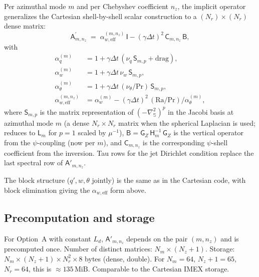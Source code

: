 \documentclass[11pt]{article}
\newcommand{\Lapsphere}{\nabla^2_{\!\mathbb{S}}}
\newcommand{\Ld}{L_d}
\newcommand{\Ra}{\mathrm{Ra}}
\newcommand{\Pr}{\mathrm{Pr}}
\begin{document}
Per azimuthal mode $m$ and per Chebyshev coefficient $n_{z}$, the
implicit operator generalizes the Cartesian shell-by-shell scalar
construction to a $(N_{r}) \times (N_{r})$ dense matrix:
\begin{equation}
  \mathsf{A}_{m, n_{z}}^{\prime}
  \;=\; \alpha_{w,\mathrm{eff}}^{(m, n_{z})}\,\mathsf{I}
  - (\gamma \Delta t)^{2}\,\mathsf{C}_{m, n_{z}}\,\mathsf{B},
  \label{eq:Aprime}
\end{equation}
with
\begin{align}
  \alpha_{q}^{(m)}     &= 1 + \gamma \Delta t\,(\nu_{q}\,\mathsf{S}_{m,p} + \mathrm{drag}), \\
  \alpha_{w}^{(m)}     &= 1 + \gamma \Delta t\,\nu_{w}\,\mathsf{S}_{m,p}, \\
  \alpha_{\theta}^{(m)}&= 1 + \gamma \Delta t\,(\nu_{\theta}/\Pr)\,\mathsf{S}_{m,p}, \\
  \alpha_{w,\mathrm{eff}}^{(m,n_z)} &= \alpha_{w}^{(m)} - (\gamma \Delta t)^{2}\,(\Ra/\Pr)/\alpha_{\theta}^{(m)},
\end{align}
where $\mathsf{S}_{m, p}$ is the matrix representation of
$(-\Lapsphere)^{p}$ in the Jacobi basis at azimuthal mode $m$ (a
dense $N_{r} \times N_{r}$ matrix when the spherical Laplacian is
used; reduces to $\mathsf{L}_{m}$ for $p = 1$ scaled by
$\mu^{-1}$), $\mathsf{B} = \mathsf{G}_{Z}\,\mathsf{H}_{m}^{-1}\,
\mathsf{G}_{Z}$ is the vertical operator from the $\psi$-coupling
(now per $m$), and $\mathsf{C}_{m, n_{z}}$ is the corresponding
$\psi$-shell coefficient from the inversion.  Tau rows for the jet
Dirichlet condition replace the last spectral row of
$\mathsf{A}'_{m,n_{z}}$.

The block structure ($q', w, \theta$ jointly) is the same as in the
Cartesian code, with block elimination giving the
$\alpha_{w,\mathrm{eff}}$ form above.

\subsection{Precomputation and storage}

For Option~A with constant $\Ld$, $\mathsf{A}'_{m,n_{z}}$ depends on
the pair $(m, n_{z})$ and is precomputed once.  Number of distinct
matrices: $N_{m} \times (N_{z} + 1)$.  Storage: $N_{m} \times
(N_{z}+1) \times N_{r}^{2} \times 8$ bytes (dense, double).  For
$N_{m} = 64$, $N_{z}+1 = 65$, $N_{r} = 64$, this is $\approx
135\,\mathrm{MiB}$.  Comparable to the Cartesian IMEX storage.

\end{document}
